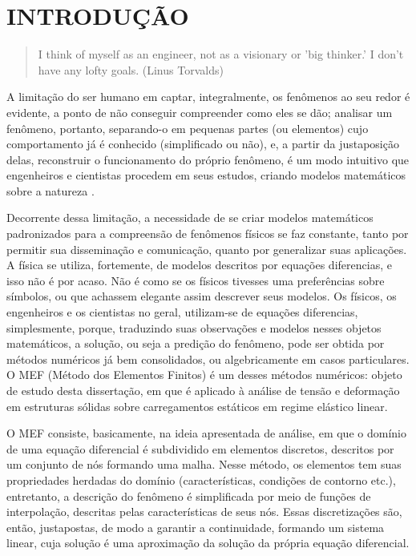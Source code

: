 

\chapter{INTRODUÇÃO}

\begin{quote}
    I think of myself as an engineer, not as a visionary or 'big thinker.' I don't have any lofty goals.
    (Linus Torvalds)  
\end{quote}

A limitação do ser humano em captar, integralmente, os fenômenos ao seu redor é evidente, a ponto de não conseguir compreender como eles se dão; analisar um fenômeno, portanto, separando-o em pequenas partes (ou elementos) cujo comportamento já é conhecido (simplificado ou não), e, a partir da justaposição delas, reconstruir o funcionamento do próprio fenômeno, é um modo intuitivo que engenheiros e cientistas procedem em seus estudos, criando modelos matemáticos sobre a natureza \cite[p. 2]{Zin}.

Decorrente dessa limitação, a necessidade de se criar modelos matemáticos padronizados para a compreensão de fenômenos físicos se faz constante, tanto por permitir sua disseminação e comunicação, quanto por generalizar suas aplicações. A física se utiliza, fortemente, de modelos descritos por equações diferencias, e isso não é por acaso. Não é como se os físicos tivesses uma preferências sobre símbolos, ou que achassem elegante assim descrever seus modelos. Os físicos, os engenheiros e os cientistas no geral, utilizam-se de equações diferencias, simplesmente, porque, traduzindo suas observações e modelos nesses objetos matemáticos, a solução, ou seja a predição do fenômeno, pode ser obtida por métodos numéricos já bem consolidados, ou algebricamente em casos particulares. O MEF (Método dos Elementos Finitos) é um desses métodos numéricos: objeto de estudo desta dissertação, em que é aplicado à análise de tensão e deformação em estruturas sólidas sobre carregamentos estáticos em regime elástico linear.

O MEF consiste, basicamente, na ideia apresentada de análise, em que o domínio de uma equação diferencial é subdividido em elementos discretos, descritos por um conjunto de nós formando uma malha. Nesse método, os elementos tem suas propriedades herdadas do domínio (características, condições de contorno etc.), entretanto, a descrição do fenômeno é simplificada por meio de funções de interpolação, descritas pelas características de seus nós. Essas discretizações são, então, justapostas, de modo a garantir a continuidade, formando um sistema linear, cuja solução é uma aproximação da solução da própria equação diferencial. 

